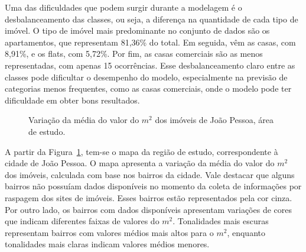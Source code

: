 \documentclass[
  12pt,
  a4paper,
]{scrreprt}
\begin{document}
\vspace{12pt}

Uma das dificuldades que podem surgir durante a modelagem é o
desbalanceamento das classes, ou seja, a diferença na quantidade de cada
tipo de imóvel. O tipo de imóvel mais predominante no conjunto de dados
são os apartamentos, que representam 81,36\% do total. Em seguida, vêm
as casas, com 8,91\%, e os flats, com 5,72\%. Por fim, as casas
comerciais são as menos representadas, com apenas 15 ocorrências. Esse
desbalanceamento claro entre as classes pode dificultar o desempenho do
modelo, especialmente na previsão de categorias menos frequentes, como
as casas comerciais, onde o modelo pode ter dificuldade em obter bons
resultados.

\vspace{12pt}

\begin{figure}


\caption{\label{fig-mapa_valor}Variação da média do valor do \(m^2\) dos
imóveis de João Pessoa, área de estudo.}

\end{figure}%

A partir da Figura~\ref{fig-mapa_valor}, tem-se o mapa da região de
estudo, correspondente à cidade de João Pessoa. O mapa apresenta a
variação da média do valor do \(m^2\) dos imóveis, calculada com base
nos bairros da cidade. Vale destacar que alguns bairros não possuíam
dados disponíveis no momento da coleta de informações por raspagem dos
sites de imóveis. Esses bairros estão representados pela cor cinza. Por
outro lado, os bairros com dados disponíveis apresentam variações de
cores que indicam diferentes faixas de valores do \(m^2\). Tonalidades
mais escuras representam bairros com valores médios mais altos para o
\(m^2\), enquanto tonalidades mais claras indicam valores médios
menores.
\end{document}
